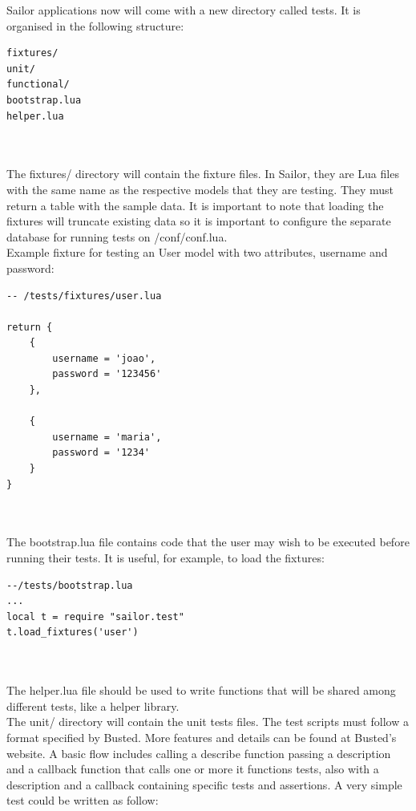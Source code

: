 \documentclass{article}
\begin{document}
Sailor applications now will come with a new directory called tests. It is organised in the following structure:\\

\begin{lstlisting}[frame=single]
fixtures/
unit/
functional/
bootstrap.lua
helper.lua
\end{lstlisting}\\\\

The fixtures/ directory will contain the fixture files. In Sailor, they are Lua files with the same name as the respective models that they are testing. They must return a table with the sample data. It is important to note that loading the fixtures will truncate existing data so it is important to configure the separate database for running tests on /conf/conf.lua.\\

Example fixture for testing an User model with two attributes, username and password:\\

\begin{lstlisting}[frame=single]
-- /tests/fixtures/user.lua

return {
    {
        username = 'joao',
        password = '123456'
    },

    {
        username = 'maria',
        password = '1234'
    }
}
\end{lstlisting}\\\\

The bootstrap.lua file contains code that the user may wish to be executed before running their tests. It is useful, for example, to load the fixtures:\\

\begin{lstlisting}[frame=single]
--/tests/bootstrap.lua
...
local t = require "sailor.test"
t.load_fixtures('user') 
\end{lstlisting}\\\\

The helper.lua file should be used to write functions that will be shared among different tests, like a helper library.\\

The unit/ directory will contain the unit tests files. The test scripts must follow a format specified by Busted. More features and details can be found at Busted’s website. A basic flow includes calling a describe function passing a description and a callback function that calls one or more it functions tests, also with a description and a callback containing specific tests and assertions. A very simple test could be written as follow:\\
\end{document}
